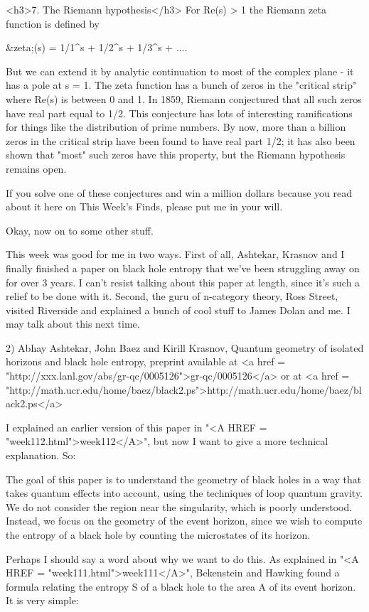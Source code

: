 <h3>7. The Riemann hypothesis</h3>
For Re(s) > 1 the Riemann zeta function is defined by 

&zeta;(s) = 1/1^{s} + 1/2^{s} + 1/3^{s} + ....


But we can extend it by analytic continuation to most
of the complex plane - it has a pole at s = 1.
The zeta function has a bunch of zeros in the "critical strip" where
Re(s) is between 0 and 1. In 1859, Riemann conjectured that all such zeros
have real part equal to 1/2. This conjecture has lots of interesting 
ramifications
for things like the distribution of prime numbers. By now, more than a
billion zeros in the critical strip have been found to have real part 1/2;
it has also been shown that "most" such zeros have this property, but the
Riemann hypothesis remains open.

If you solve one of these conjectures and win a million dollars because
you read about it here on This Week's Finds, please put me in your will.

Okay, now on to some other stuff.

This week was good for me in two ways.  First of all, Ashtekar, Krasnov
and I finally finished a paper on black hole entropy that we've been
struggling away on for over 3 years.  I can't resist talking about this
paper at length, since it's such a relief to be done with it.  Second, 
the guru of n-category theory, Ross Street, visited Riverside and explained 
a bunch of cool stuff to James Dolan and me.  I may talk about this next
time.  

2) Abhay Ashtekar, John Baez and Kirill Krasnov, Quantum geometry of
isolated horizons and black hole entropy, preprint available at 
<a href = "http://xxx.lanl.gov/abs/gr-qc/0005126">gr-qc/0005126</a>
or at <a href = "http://math.ucr.edu/home/baez/black2.ps">http://math.ucr.edu/home/baez/black2.ps</a>

I explained an earlier version of this paper in "<A HREF = "week112.html">week112</A>", but now I
want to give a more technical explanation.  So:

The goal of this paper is to understand the geometry of black holes in a
way that takes quantum effects into account, using the techniques of
loop quantum gravity.  We do not consider the region near the singularity, 
which is poorly understood.  Instead, we focus on the geometry of the
event horizon, since we wish to compute the entropy of a black hole by
counting the microstates of its horizon.  

Perhaps I should say a word about why we want to do this.  As explained
in "<A HREF = "week111.html">week111</A>", Bekenstein and Hawking found a formula relating the
entropy S of a black hole to the area A of its event horizon.  It is
very simple:


